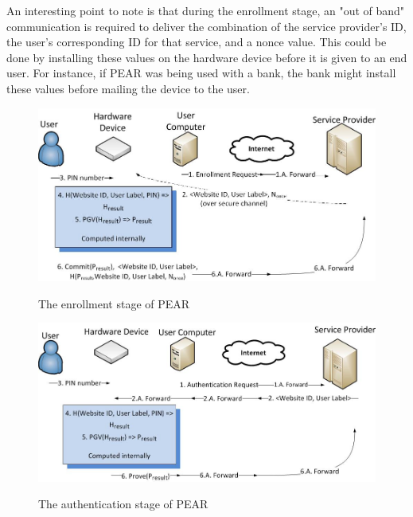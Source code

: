 An interesting point to note is that during the enrollment stage, an "out of band" communication is required to deliver
the combination of the service provider's ID, the user's corresponding ID for that service, and a nonce value. This could
be done by installing these values on the hardware device before it is given to an end user. For instance, if PEAR was being
used with a bank, the bank might install these values before mailing the device to the user.

\begin{figure}[!ht]
\includegraphics[width=500px]{images/enrollment.jpg}
\label{fig:pearenrollment}
\caption{The enrollment stage of PEAR}
\end{figure}
\FloatBarrier

\begin{figure}[!ht]
\includegraphics[width=500px]{images/auth.jpg}
\label{fig:pearauthentication}
\caption{The authentication stage of PEAR}
\end{figure}
\FloatBarrier

